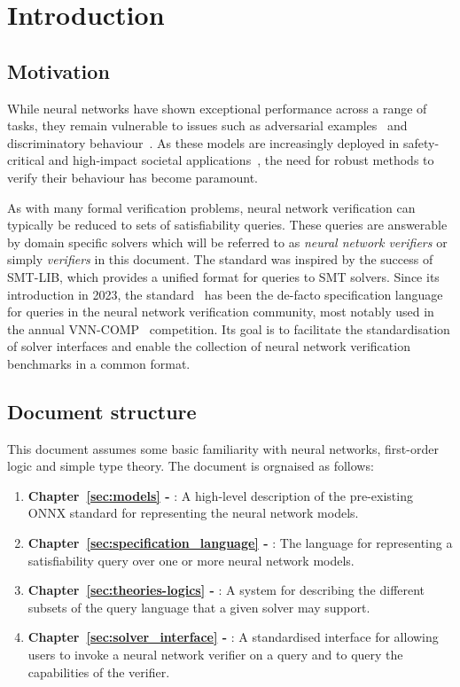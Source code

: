 \chapter{Introduction}
\label{sec:intro}

\section{Motivation}

While neural networks have shown exceptional performance across a range of tasks, 
they remain vulnerable to issues such as adversarial examples~\cite{szegedy2013intriguing} and discriminatory behaviour~\cite{4}. As these models are increasingly deployed in safety-critical and high-impact societal applications~\cite{1,2,3}, the need for robust methods to verify their behaviour has become paramount.

As with many formal verification problems, neural network verification can typically be reduced to sets of satisfiability queries. These queries are answerable by domain specific solvers which will be referred to as \emph{neural network verifiers} or simply \emph{verifiers} in this document. The \vnnlib{} standard was inspired by the success of SMT-LIB, which provides a unified format for queries to SMT solvers. 
Since its introduction in 2023, the \vnnlib{} standard~\cite{5} has been the de-facto specification language for queries in the neural network verification community, most notably used in the annual VNN-COMP~\cite{7} competition. Its goal is to facilitate the standardisation of solver interfaces and enable the collection of neural network verification benchmarks in a common format. 

\section{Document structure}

This document assumes some basic familiarity with neural networks, first-order logic and simple type theory. The document is orgnaised as follows:
\begin{enumerate}
\item \textbf{Chapter~\ref{sec:models} - }: A high-level description of the pre-existing ONNX standard for representing the neural network models.
\item \textbf{Chapter~\ref{sec:specification_language} - }: The \vnnlib{} language for representing a satisfiability query over one or more neural network models.
\item \textbf{Chapter~\ref{sec:theories-logics} - }: A system for describing the different subsets of the query language that a given solver may support.
\item \textbf{Chapter~\ref{sec:solver_interface} - }: A standardised interface for allowing users to invoke a neural network verifier on a query and to query the capabilities of the verifier.
\end{enumerate}

